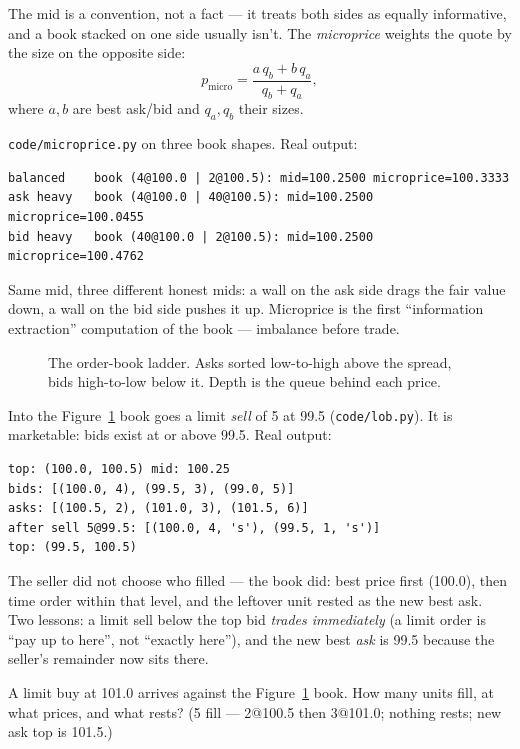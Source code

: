 The mid is a convention, not a fact --- it treats both sides as
equally informative, and a book stacked on one side usually isn't.
The \emph{microprice} weights the quote by the size on the opposite
side:
\[
p_{\text{micro}}=\frac{a\,q_b + b\,q_a}{q_b+q_a},
\]
where $a,b$ are best ask/bid and $q_a,q_b$ their sizes.

\begin{example}\label{ex:microprice}
\texttt{code/microprice.py} on three book shapes. Real output:
\begin{lstlisting}[numbers=none]
balanced    book (4@100.0 | 2@100.5): mid=100.2500 microprice=100.3333
ask heavy   book (4@100.0 | 40@100.5): mid=100.2500 microprice=100.0455
bid heavy   book (40@100.0 | 2@100.5): mid=100.2500 microprice=100.4762
\end{lstlisting}
Same mid, three different honest mids: a wall on the ask side drags
the fair value down, a wall on the bid side pushes it up.
Microprice is the first ``information extraction'' computation of
the book --- imbalance before trade.
\end{example}

\begin{figure}[ht]\centering

\caption{The order-book ladder. Asks sorted low-to-high above the
spread, bids high-to-low below it. Depth is the queue behind each
price.}
\label{fig:ladder}
\end{figure}

\begin{example}\label{ex:match}
Into the Figure~\ref{fig:ladder} book goes a limit \emph{sell} of 5
at 99.5 (\texttt{code/lob.py}). It is marketable: bids exist at or
above 99.5. Real output:
\begin{lstlisting}[numbers=none]
top: (100.0, 100.5) mid: 100.25
bids: [(100.0, 4), (99.5, 3), (99.0, 5)]
asks: [(100.5, 2), (101.0, 3), (101.5, 6)]
after sell 5@99.5: [(100.0, 4, 's'), (99.5, 1, 's')]
top: (99.5, 100.5)
\end{lstlisting}
The seller did not choose who filled --- the book did: best price
first (100.0), then time order within that level, and the leftover
unit rested as the new best ask. Two lessons: a limit sell below
the top bid \emph{trades immediately} (a limit order is ``pay up to
here'', not ``exactly here''), and the new best \emph{ask} is 99.5
because the seller's remainder now sits there.
\end{example}

\begin{checkpoint}
A limit buy at 101.0 arrives against the
Figure~\ref{fig:ladder} book. How many units fill, at what
prices, and what rests? (5 fill --- 2@100.5 then 3@101.0; nothing
rests; new ask top is 101.5.)
\end{checkpoint}


